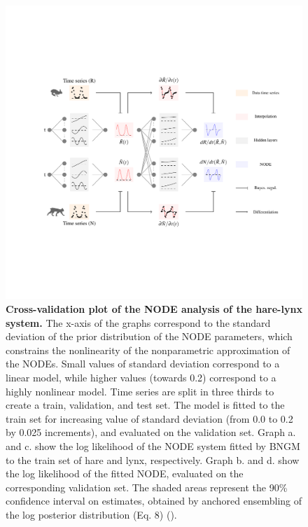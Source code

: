 \documentclass[11pt, oneside]{article}
\begin{document}
\newpage
\begin{figure}[H]
\includegraphics[width=1\linewidth,page=24]{figures/main.pdf}
\caption{
    \textbf{Cross-validation plot of the NODE analysis of the hare-lynx system.}
    The x-axis of the graphs correspond to the standard deviation of the prior distribution of the NODE parameters, which constrains the nonlinearity of the nonparametric approximation of the NODEs.
    Small values of standard deviation correspond to a linear model, while higher values (towards 0.2) correspond to a highly nonlinear model.
    Time series are split in three thirds to create a train, validation, and test set. 
    The model is fitted to the train set for increasing value of standard deviation (from 0.0 to 0.2 by 0.025 increments), and evaluated on the validation set.
    Graph a. and c. show the log likelihood of the NODE system fitted by BNGM to the train set of hare and lynx, respectively.
    Graph b. and d. show the log likelihood of the fitted NODE, evaluated on the corresponding validation set.
    The shaded areas represent the 90\% confidence interval on estimates, obtained by anchored ensembling of the log posterior distribution (Eq. 8) (\cite{Pearce2018}).
}
\end{figure}
\newpage
\end{document}
